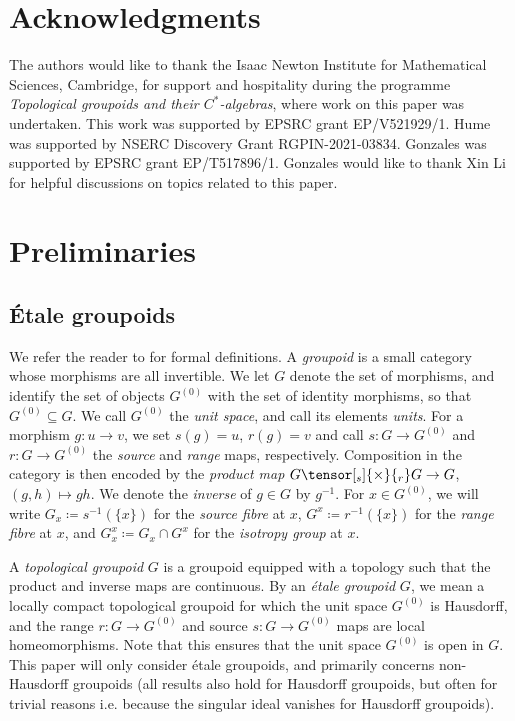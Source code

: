 \documentclass[11pt, oneside, reqno]{amsart}
\newcommand{\Gu}{G^{(0)}}
\theoremstyle{definition}
\theoremstyle{remark}
\numberwithin{equation}{section}
\begin{document}
\section*{Acknowledgments}
The authors would like to thank the Isaac Newton Institute for Mathematical Sciences, Cambridge, for support and hospitality during the programme \emph{Topological groupoids and their $C^{*}$-algebras}, where work on this paper was undertaken. This work was supported by EPSRC grant EP/V521929/1. Hume was supported by NSERC Discovery Grant RGPIN-2021-03834. Gonzales was supported by EPSRC grant EP/T517896/1. Gonzales would like to thank Xin Li for helpful discussions on topics related to this paper.


\section{Preliminaries}\label{Preliminaries}

\subsection{\'Etale groupoids}\label{prelim:etale_gpd}
We refer the reader to \cite{Ren} for formal definitions. A \emph{groupoid} is a small category whose morphisms are all invertible. We let $G$ denote the set of morphisms, and identify the set of objects $\Gu$ with the set of identity morphisms, so that $\Gu \subseteq G$. We call $\Gu$ the \emph{unit space}, and call its elements \emph{units}. For a morphism $g \colon u\to v$, we set $s(g) = u$, $r(g) = v$ and call $s \colon G \to \Gu$ and  $r \colon G \to \Gu$ the \emph{source} and \emph{range} maps, respectively. Composition in the category is then encoded by the \emph{product map} $G\tensor[_s]{\times}{_r} G\to G$, $(g,h) \mapsto gh$. We denote the \emph{inverse} of $g\in G$ by $g^{-1}$. For $x \in \Gu$, we will write $G_x \coloneq s^{-1}(\{x\})$ for the \emph{source fibre} at $x$, $G^x \coloneq r^{-1}(\{x\})$ for the \emph{range fibre} at $x$, and $G^x_x \coloneq G_x \cap G^x$ for the \emph{isotropy group} at $x$.

A \emph{topological groupoid} $G$ is a groupoid equipped with a topology such that the product and inverse maps are continuous. By an \emph{\'etale groupoid} $G$, we mean a locally compact topological groupoid for which the unit space $\Gu$ is Hausdorff, and the range $r \colon G \to \Gu$ and source $s \colon G \to \Gu$ maps are local homeomorphisms. Note that this ensures that the unit space $\Gu$ is open in $G$. This paper will only consider \'etale groupoids, and primarily concerns non-Hausdorff groupoids (all results also hold for Hausdorff groupoids, but often for trivial reasons i.e. because the singular ideal vanishes for Hausdorff groupoids).
\end{document}
